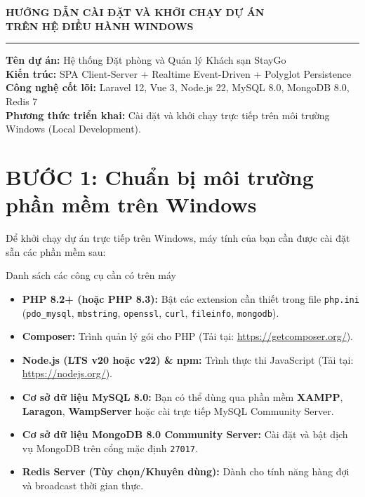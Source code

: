 \documentclass[11pt,a4paper]{article}
\newcommand{\codeinline}[1]{\texttt{#1}}
\begin{document}
\begin{center}
  \vspace*{1mm}
  {\fontsize{16}{20}\selectfont\bfseries HƯỚNG DẪN CÀI ĐẶT VÀ KHỞI CHẠY DỰ ÁN\\TRÊN HỆ ĐIỀU HÀNH WINDOWS\par}
  \vspace{2.5mm}
  \noindent\rule{0.6\textwidth}{0.8pt}
  \vspace{2mm}
\end{center}

\begin{tcolorbox}[colback=white,colframe=black,arc=1.5mm,boxrule=0.6pt,left=3.5mm,right=3.5mm,top=2mm,bottom=2mm]
\small
\textbf{Tên dự án:} Hệ thống Đặt phòng và Quản lý Khách sạn StayGo\\
\textbf{Kiến trúc:} SPA Client-Server + Realtime Event-Driven + Polyglot Persistence\\
\textbf{Công nghệ cốt lõi:} Laravel 12, Vue 3, Node.js 22, MySQL 8.0, MongoDB 8.0, Redis 7\\
\textbf{Phương thức triển khai:} Cài đặt và khởi chạy trực tiếp trên môi trường Windows (Local Development).
\end{tcolorbox}

\vspace{1mm}

\section{BƯỚC 1: Chuẩn bị môi trường phần mềm trên Windows}

Để khởi chạy dự án trực tiếp trên Windows, máy tính của bạn cần được cài đặt sẵn các phần mềm sau:

\begin{stepbox}{Danh sách các công cụ cần có trên máy}
\begin{itemize}[leftmargin=5mm,itemsep=2pt]
  \item \textbf{PHP 8.2+ (hoặc PHP 8.3):} Bật các extension cần thiết trong file \texttt{php.ini} (\codeinline{pdo\_mysql}, \codeinline{mbstring}, \codeinline{openssl}, \codeinline{curl}, \codeinline{fileinfo}, \codeinline{mongodb}).
  \item \textbf{Composer:} Trình quản lý gói cho PHP (Tải tại: \url{https://getcomposer.org/}).
  \item \textbf{Node.js (LTS v20 hoặc v22) \& npm:} Trình thực thi JavaScript (Tải tại: \url{https://nodejs.org/}).
  \item \textbf{Cơ sở dữ liệu MySQL 8.0:} Bạn có thể dùng qua phần mềm \textbf{XAMPP}, \textbf{Laragon}, \textbf{WampServer} hoặc cài trực tiếp MySQL Community Server.
  \item \textbf{Cơ sở dữ liệu MongoDB 8.0 Community Server:} Cài đặt và bật dịch vụ MongoDB trên cổng mặc định \texttt{27017}.
  \item \textbf{Redis Server (Tùy chọn/Khuyên dùng):} Dành cho tính năng hàng đợi và broadcast thời gian thực.
\end{itemize}
\end{stepbox}
\end{document}
